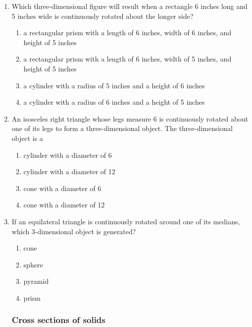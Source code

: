 \documentclass[12pt, twoside]{article}
\begin{document}
\begin{enumerate}
  \item %
  Which three-dimensional figure will result when a rectangle 6 inches long and 5 inches wide is continuously rotated about the longer side?
    \begin{enumerate}
      \item a rectangular prism with a length of 6 inches, width of 6 inches, and height of 5 inches
      \item a rectangular prism with a length of 6 inches, width of 5 inches, and height of 5 inches
      \item a cylinder with a radius of 5 inches and a height of 6 inches
      \item a cylinder with a radius of 6 inches and a height of 5 inches
    \end{enumerate}

  \item %
  An isosceles right triangle whose legs measure 6 is continuously rotated about one of its legs to form a three-dimensional object. The three-dimensional object is a
    \begin{enumerate}
      \item cylinder with a diameter of 6
      \item cylinder with a diameter of 12
      \item cone with a diameter of 6
      \item cone with a diameter of 12
    \end{enumerate}

  \item If an equilateral triangle is continuously rotated around one of its medians, which 3-dimensional object is generated?
    \begin{enumerate}
      \item cone
      \item sphere
      \item pyramid
      \item prism
    \end{enumerate}

  \newpage	
  \subsubsection*{Cross sections of solids} %
    

\end{enumerate}
\end{document}
